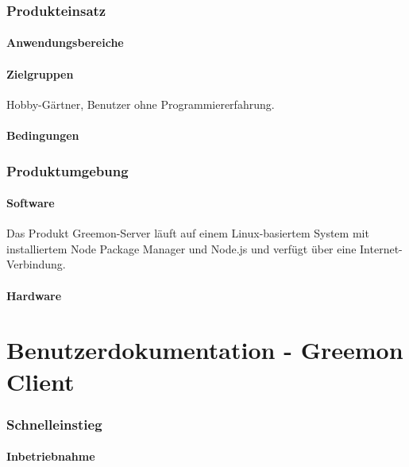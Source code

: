 \documentclass[pointlessnumbers]{scrartcl}
\begin{document}
\section{Produkteinsatz}
\subsection{Anwendungsbereiche}
%
%
\subsection{Zielgruppen}
    Hobby-Gärtner, Benutzer ohne Programmiererfahrung. 
\subsection{Bedingungen}
%
%

\section{Produktumgebung}
\subsection{Software}
 Das Produkt Greemon-Server läuft auf einem Linux-basiertem System mit installiertem Node Package Manager und Node.js und verfügt über eine Internet-Verbindung.

\subsection{Hardware}
%
%






\newpage
\part{Benutzerdokumentation - Greemon Client}
\section{Schnelleinstieg}
    \subsection{Inbetriebnahme}
\end{document}
